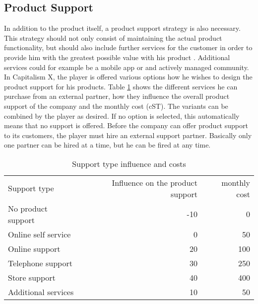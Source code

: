 \subsection{Product Support}  \label{product_support_simulation}


In addition to the product itself, a product support strategy is also necessary. This strategy should not only consist of maintaining the actual product functionality, but should also include further services for the customer in order to provide him with the greatest possible value with his product \cite{markeset_design_2003}. Additional services could for example be a mobile app or and actively managed community.  
In Capitalism X, the player is offered various options how he wishes to design the product support for his products. Table \ref{Support_types} shows the different services he can purchase from an external partner, how they influence the overall product support of the company and the monthly cost (\gls{cST}). The variants can be combined by the player as desired. If no option is selected, this automatically means that no support is offered.
Before the company can offer product support to its customers, the player must hire an external support partner. Basically only one partner can be hired at a time, but he can be fired at any time.

\begin{table}[ht]
    \centering
    \begin{tabular}{|l|r|r|}
    \hline
    Support type & Influence on the product support & monthly cost \\
    No product support   & -10   & 0    \\
    Online self service  & 0     & 50   \\
    Online support       & 20    & 100  \\
    Telephone support    & 30    & 250  \\
    Store support        & 40    & 400  \\
    Additional services  & 10    & 50   \\     
    \hline
    \end{tabular}
    \caption{Support type influence and costs}
    \label{Support_types}
\end{table}

